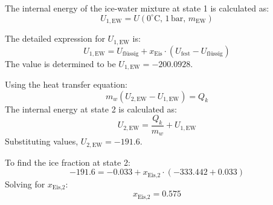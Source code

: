 The internal energy of the ice-water mixture at state 1 is calculated as:  
\[
U_{1,\text{EW}} = U(0^\circ\text{C}, \, 1 \, \text{bar}, \, m_{\text{EW}})
\]  

The detailed expression for \( U_{1,\text{EW}} \) is:  
\[
U_{1,\text{EW}} = U_{\text{flüssig}} + x_{\text{Eis}} \cdot (U_{\text{fest}} - U_{\text{flüssig}})
\]  
The value is determined to be \( U_{1,\text{EW}} = -200.0928 \).  

Using the heat transfer equation:  
\[
m_w (U_{2,\text{EW}} - U_{1,\text{EW}}) = Q_k
\]  
The internal energy at state 2 is calculated as:  
\[
U_{2,\text{EW}} = \frac{Q_k}{m_w} + U_{1,\text{EW}}
\]  
Substituting values, \( U_{2,\text{EW}} = -191.6 \).  

To find the ice fraction at state 2:  
\[
-191.6 = -0.033 + x_{\text{Eis,2}} \cdot (-333.442 + 0.033)
\]  
Solving for \( x_{\text{Eis,2}} \):  
\[
x_{\text{Eis,2}} = 0.575
\]